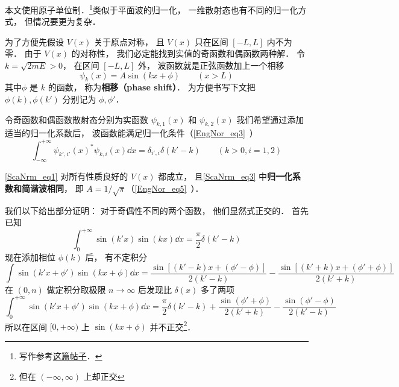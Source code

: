 
\begin{issues}
\issueDraft
\end{issues}

本文使用原子单位制．\footnote{写作参考\href{https://chaoli.club/index.php/4541/last}{这篇帖子}．}类似于平面波的归一化， 一维散射态也有不同的归一化方式， 但情况要更为复杂． 

为了方便先假设 $V(x)$ 关于原点对称， 且 $V(x)$ 只在区间 $[-L,L]$ 内不为零． 由于 $V(x)$ 的对称性， 我们必定能找到实值的奇函数和偶函数两种解． 令 $k = \sqrt{2mE} > 0$， 在区间 $[-L,L]$ 外， 波函数就是正弦函数加上一个相移
\begin{equation}\label{ScaNrm_eq3}
\psi_k(x) = A\sin(kx + \phi) \qquad (x > L)
\end{equation}
其中$\phi$ 是 $k$ 的函数， 称为\textbf{相移（phase shift）}． 为方便书写下文把 $\phi(k),\phi(k')$ 分别记为 $\phi, \phi'$．

令奇函数和偶函数散射态分别为实函数 $\psi_{k,1}(x)$ 和 $\psi_{k,2}(x)$ 我们希望通过添加适当的归一化系数后， 波函数能满足归一化条件（\autoref{EngNor_eq3}~）%
\begin{equation}\label{ScaNrm_eq1}
\int_{-\infty}^{+\infty} \psi_{k',i'}(x)^* \psi_{k,i}(x) \dd{x} = \delta_{i',i}\delta(k' - k) \qquad (k > 0, i = 1, 2)
\end{equation}

\begin{theorem}{}
\autoref{ScaNrm_eq1} 对所有性质良好的 $V(x)$ 都成立， 且\autoref{ScaNrm_eq3} 中\textbf{归一化系数和简谐波相同}， 即 $A = 1/\sqrt{\pi}$（\autoref{EngNor_eq5}~）．
\end{theorem}

我们以下给出部分证明： 对于奇偶性不同的两个函数， 他们显然式正交的． 首先已知
\begin{equation}
\int_{0}^{+\infty} \sin(k'x)\sin(kx)\dd{x} = \frac{\pi}{2}\delta(k'-k)
\end{equation}
现在添加相位 $\phi(k)$ 后， 有不定积分
\begin{equation}
\int \sin(k'x+\phi')\sin(kx+\phi) \dd{x} = \frac{\sin[(k'-k)x + (\phi'-\phi)]}{2(k'-k)}
- \frac{\sin[(k'+k)x+(\phi'+\phi)]}{2(k'+k)}
\end{equation}
在 $(0,n)$ 做定积分取极限 $n\to\infty$ 后发现比 $\delta(x)$ 多了两项
\begin{equation}
\int_{0}^{+\infty} \sin(k'x+\phi')\sin(kx+\phi) \dd{x} = \frac{\pi}{2}\delta(k'-k)
+ \frac{\sin(\phi'+\phi)}{2(k'+k)} - \frac{\sin(\phi'-\phi)}{2(k'-k)}
\end{equation}
所以在区间 $[0, +\infty)$ 上 $\sin(kx+\phi)$ 并不正交\footnote{但在 $(-\infty,\infty)$ 上却正交}．

